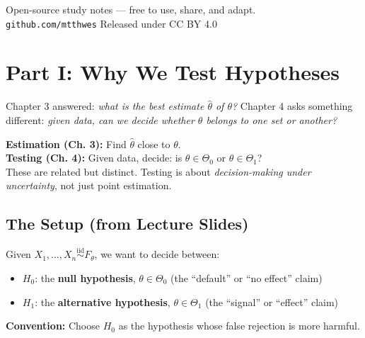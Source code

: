 \documentclass[11pt,a4paper]{article}
\newcommand{\iid}{\overset{\text{iid}}{\sim}}
\begin{document}
\begin{titlepage}
\begin{center}
  \vfill
  \begin{tcolorbox}[successbox,width=0.85\textwidth]
  \small\centering
  Open-source study notes --- free to use, share, and adapt.\\
  \texttt{github.com/mtthwes} \quad\textperiodcentered\quad Released under CC BY 4.0
  \end{tcolorbox}
\end{center}
\end{titlepage}

\tableofcontents
\newpage

\section{Part I: Why We Test Hypotheses}

Chapter 3 answered: \emph{what is the best estimate $\hat\theta$ of $\theta$?} Chapter 4 asks something different: \emph{given data, can we decide whether $\theta$ belongs to one set or another?}

\begin{tcolorbox}[infobox, title={The fundamental question shift}]
\textbf{Estimation (Ch. 3):} Find $\hat\theta$ close to $\theta$.\\
\textbf{Testing (Ch. 4):} Given data, decide: is $\theta \in \Theta_0$ or $\theta \in \Theta_1$?\\[4pt]
These are related but distinct. Testing is about \emph{decision-making under uncertainty}, not just point estimation.
\end{tcolorbox}

\subsection{The Setup (from Lecture Slides)}

\begin{tcolorbox}[defbox, title={Hypothesis test setup}]
Given $X_1,\ldots,X_n \iid F_\theta$, we want to decide between:
\begin{itemize}[leftmargin=1.5em]
  \item $H_0$: the \textbf{null hypothesis}, $\theta \in \Theta_0$ \quad (the ``default'' or ``no effect'' claim)
  \item $H_1$: the \textbf{alternative hypothesis}, $\theta \in \Theta_1$ \quad (the ``signal'' or ``effect'' claim)
\end{itemize}
\textbf{Convention:} Choose $H_0$ as the hypothesis whose false rejection is more harmful.
\end{tcolorbox}
\end{document}
